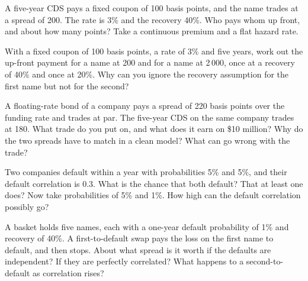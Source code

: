 \begin{question}\label{iq:iv2:credit-and-xva:5}
A five-year CDS pays a fixed coupon of 100 basis points, and the name trades at a spread of 200. The rate is 3\% and the recovery 40\%. Who pays whom up front, and about how many points? Take a continuous premium and a flat hazard rate.
\end{question}

\begin{question}\label{iq:iv2:credit-and-xva:6}
With a fixed coupon of 100 basis points, a rate of 3\% and five years, work out the up-front payment for a name at 200 and for a name at 2\,000, once at a recovery of 40\% and once at 20\%. Why can you ignore the recovery assumption for the first name but not for the second?
\end{question}

\begin{question}\label{iq:iv2:credit-and-xva:7}
A floating-rate bond of a company pays a spread of 220 basis points over the funding rate and trades at par. The five-year CDS on the same company trades at 180. What trade do you put on, and what does it earn on \$10 million? Why do the two spreads have to match in a clean model? What can go wrong with the trade?
\end{question}

\begin{question}\label{iq:iv2:credit-and-xva:8}
Two companies default within a year with probabilities 5\% and 5\%, and their default correlation is 0.3. What is the chance that both default? That at least one does? Now take probabilities of 5\% and 1\%. How high can the default correlation possibly go?
\end{question}

\begin{question}\label{iq:iv2:credit-and-xva:9}
A basket holds five names, each with a one-year default probability of 1\% and recovery of 40\%. A first-to-default swap pays the loss on the first name to default, and then stops. About what spread is it worth if the defaults are independent? If they are perfectly correlated? What happens to a second-to-default as correlation rises?
\end{question}

